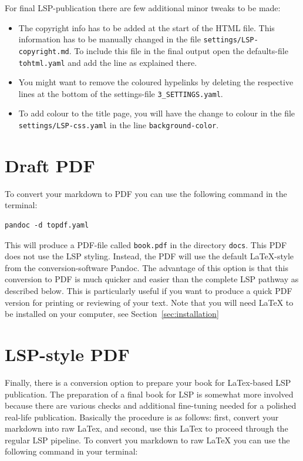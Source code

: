 For\paragraphnumber{[3.6]} final LSP-publication there are few
additional minor tweaks to be made:

\begin{itemize}
\tightlist
\item
  The copyright info has to be added at the start of the HTML file. This
  information has to be manually changed in the file
  \texttt{settings/LSP-copyright.md}. To include this file in the final
  output open the defaults-file \texttt{tohtml.yaml} and add the line as
  explained there.
\item
  You might want to remove the coloured hypelinks by deleting the
  respective lines at the bottom of the settings-file
  \texttt{3\_SETTINGS.yaml}.
\item
  To add colour to the title page, you will have the change to colour in
  the file \texttt{settings/LSP-css.yaml} in the line
  \texttt{background-color}.
\end{itemize}

\hypertarget{draft-pdf}{%
\section{Draft PDF}\label{draft-pdf}}

To\paragraphnumber{[3.7]} convert your markdown to PDF you can use the
following command in the terminal:

\begin{verbatim}
pandoc -d topdf.yaml
\end{verbatim}

This\paragraphnumber{[3.8]} will produce a PDF-file called
\texttt{book.pdf} in the directory \texttt{docs}. This PDF does not use
the LSP styling. Instead, the PDF will use the default LaTeX-style from
the conversion-software Pandoc. The advantage of this option is that
this conversion to PDF is much quicker and easier than the complete LSP
pathway as described below. This is particularly useful if you want to
produce a quick PDF version for printing or reviewing of your text. Note
that you will need LaTeX to be installed on your computer, see
Sec­tion~\ref{sec:installation}

\hypertarget{lsp-style-pdf}{%
\section{LSP-style PDF}\label{lsp-style-pdf}}

Finally,\paragraphnumber{[3.9]} there is a conversion option to prepare
your book for LaTex-based LSP publication. The preparation of a final
book for LSP is somewhat more involved because there are various checks
and additional fine-tuning needed for a polished real-life publication.
Basically the procedure is as follows: first, convert your markdown into
raw LaTex, and second, use this LaTex to proceed through the regular LSP
pipeline. To convert you markdown to raw LaTeX you can use the following
command in your terminal:

